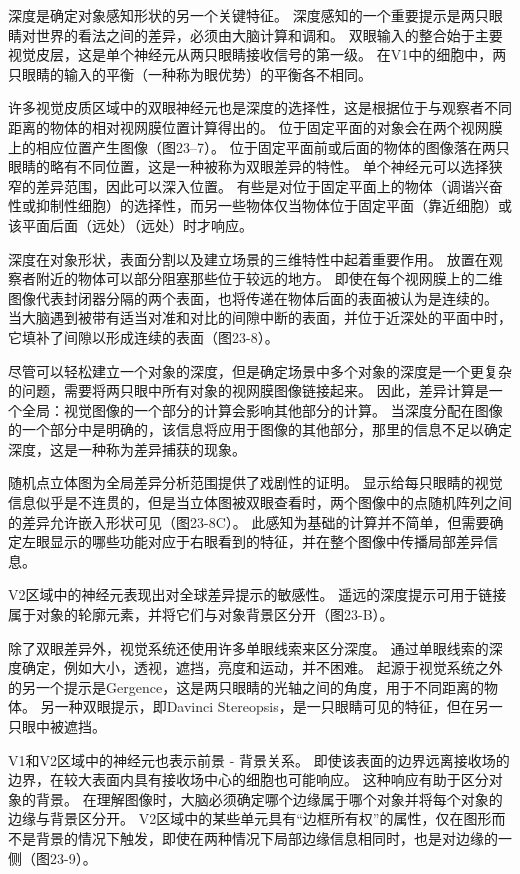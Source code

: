 深度是确定对象感知形状的另一个关键特征。 深度感知的一个重要提示是两只眼睛对世界的看法之间的差异，必须由大脑计算和调和。 双眼输入的整合始于主要视觉皮层，这是单个神经元从两只眼睛接收信号的第一级。 在V1中的细胞中，两只眼睛的输入的平衡（一种称为眼优势）的平衡各不相同。

许多视觉皮质区域中的双眼神经元也是深度的选择性，这是根据位于与观察者不同距离的物体的相对视网膜位置计算得出的。 位于固定平面的对象会在两个视网膜上的相应位置产生图像（图23–7）。 位于固定平面前或后面的物体的图像落在两只眼睛的略有不同位置，这是一种被称为双眼差异的特性。 单个神经元可以选择狭窄的差异范围，因此可以深入位置。 有些是对位于固定平面上的物体（调谐兴奋性或抑制性细胞）的选择性，而另一些物体仅当物体位于固定平面（靠近细胞）或该平面后面（远处）（远处）时才响应。

深度在对象形状，表面分割以及建立场景的三维特性中起着重要作用。 放置在观察者附近的物体可以部分阻塞那些位于较远的地方。 即使在每个视网膜上的二维图像代表封闭器分隔的两个表面，也将传递在物体后面的表面被认为是连续的。 当大脑遇到被带有适当对准和对比的间隙中断的表面，并位于近深处的平面中时，它填补了间隙以形成连续的表面（图23-8）。

尽管可以轻松建立一个对象的深度，但是确定场景中多个对象的深度是一个更复杂的问题，需要将两只眼中所有对象的视网膜图像链接起来。 因此，差异计算是一个全局：视觉图像的一个部分的计算会影响其他部分的计算。 当深度分配在图像的一个部分中是明确的，该信息将应用于图像的其他部分，那里的信息不足以确定深度，这是一种称为差异捕获的现象。

随机点立体图为全局差异分析范围提供了戏剧性的证明。 显示给每只眼睛的视觉信息似乎是不连贯的，但是当立体图被双眼查看时，两个图像中的点随机阵列之间的差异允许嵌入形状可见（图23-8C）。 此感知为基础的计算并不简单，但需要确定左眼显示的哪些功能对应于右眼看到的特征，并在整个图像中传播局部差异信息。

V2区域中的神经元表现出对全球差异提示的敏感性。 遥远的深度提示可用于链接属于对象的轮廓元素，并将它们与对象背景区分开（图23-B）。

除了双眼差异外，视觉系统还使用许多单眼线索来区分深度。 通过单眼线索的深度确定，例如大小，透视，遮挡，亮度和运动，并不困难。 起源于视觉系统之外的另一个提示是Gergence，这是两只眼睛的光轴之间的角度，用于不同距离的物体。 另一种双眼提示，即Davinci Stereopsis，是一只眼睛可见的特征，但在另一只眼中被遮挡。

V1和V2区域中的神经元也表示前景 - 背景关系。 即使该表面的边界远离接收场的边界，在较大表面内具有接收场中心的细胞也可能响应。 这种响应有助于区分对象的背景。 在理解图像时，大脑必须确定哪个边缘属于哪个对象并将每个对象的边缘与背景区分开。 V2区域中的某些单元具有“边框所有权”的属性，仅在图形而不是背景的情况下触发，即使在两种情况下局部边缘信息相同时，也是对边缘的一侧（图23-9）。


